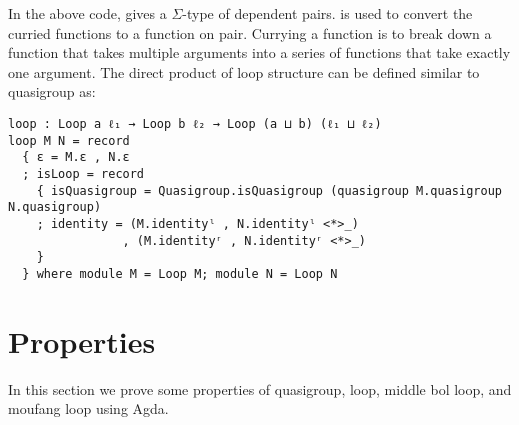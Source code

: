 In the above code,  gives a $\Sigma$-type of dependent pairs.
\inline{<*>} is used to convert the curried functions to a function on pair.
Currying a function is to break down a function that takes multiple arguments
into a series of functions that take exactly one argument. The direct product of
loop structure can be defined similar to quasigroup as:

\begin{verbatim}
loop : Loop a ℓ₁ → Loop b ℓ₂ → Loop (a ⊔ b) (ℓ₁ ⊔ ℓ₂)
loop M N = record
  { ε = M.ε , N.ε
  ; isLoop = record
    { isQuasigroup = Quasigroup.isQuasigroup (quasigroup M.quasigroup N.quasigroup)
    ; identity = (M.identityˡ , N.identityˡ <*>_)
                , (M.identityʳ , N.identityʳ <*>_)
    }
  } where module M = Loop M; module N = Loop N
\end{verbatim}

\section{Properties}
In this section we prove some properties of quasigroup, loop, middle bol loop, and moufang loop using
Agda.
